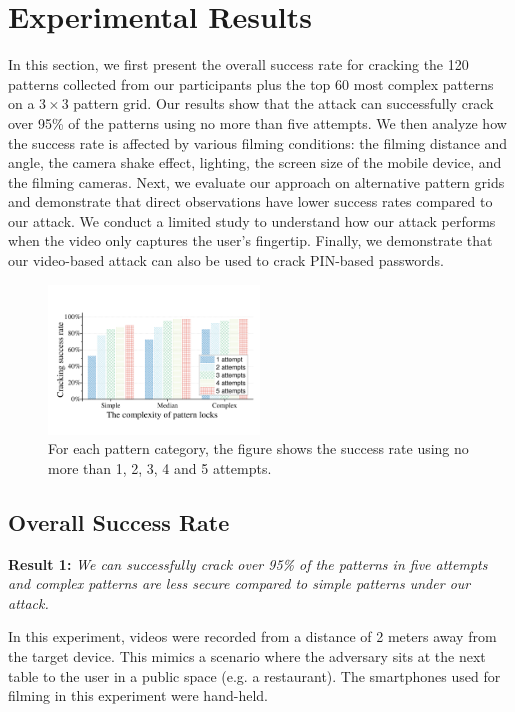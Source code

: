 \section{Experimental Results}
    In this section, we first present the overall success rate for cracking
    the 120 patterns collected from our participants plus the top 60 most complex patterns
    on a $3\times3$ pattern grid.
    Our results show that the attack can successfully crack over 95\% of the
    patterns using no more than five attempts. We then analyze how the
     success rate is affected by various filming conditions: the filming distance and angle,
    the camera shake effect, lighting, the screen size of the mobile device, and the filming cameras. Next, we evaluate our approach on alternative pattern grids and demonstrate that direct observations have lower success rates compared to our attack.
    We conduct a limited study to understand how our attack performs when the video only captures the user's fingertip.
     Finally, we demonstrate that our video-based attack can also be used to crack PIN-based passwords.

\begin{figure}[!t]
    \centering
    \includegraphics[width=0.5\textwidth]{fig/10.pdf}
    \caption{For each pattern category, the figure shows the success rate using no more than 1, 2, 3, 4 and 5 attempts.}
    \label{fig:fig10}
\end{figure}

    \subsection{Overall Success Rate \label{sec:overall_rate}}

    \noindent \textbf{Result 1:}  \emph{We can successfully crack over 95\% of the patterns in five attempts and complex patterns are less secure compared to simple patterns under our attack.}


        In this experiment, videos were recorded from a distance of 2 meters away
        from the target device. This mimics a scenario where the adversary sits
        at the next table to the user in a public space (e.g. a restaurant).
        The smartphones used for filming in this experiment were hand-held.

